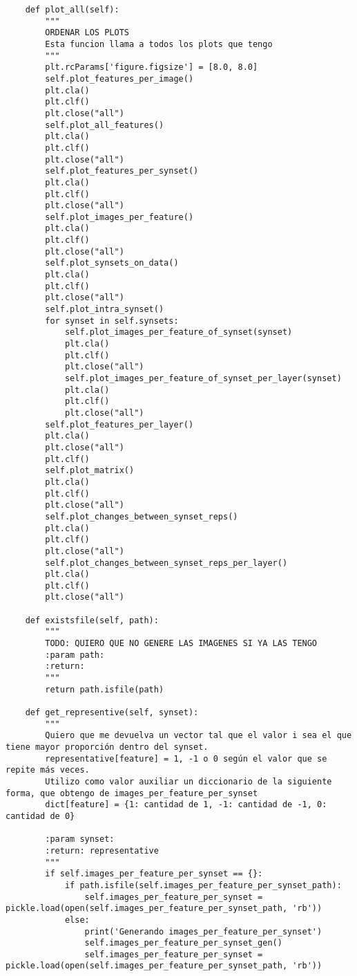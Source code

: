 \documentclass[12,twoside]{TFG-GM}
\theoremstyle{definition}
\theoremstyle{remark}
\begin{document}
\begin{verbatim}
    def plot_all(self):
        """
        ORDENAR LOS PLOTS
        Esta funcion llama a todos los plots que tengo
        """
        plt.rcParams['figure.figsize'] = [8.0, 8.0]
        self.plot_features_per_image()
        plt.cla()
        plt.clf()
        plt.close("all")
        self.plot_all_features()
        plt.cla()
        plt.clf()
        plt.close("all")
        self.plot_features_per_synset()
        plt.cla()
        plt.clf()
        plt.close("all")
        self.plot_images_per_feature()
        plt.cla()
        plt.clf()
        plt.close("all")
        self.plot_synsets_on_data()
        plt.cla()
        plt.clf()
        plt.close("all")
        self.plot_intra_synset()
        for synset in self.synsets:
            self.plot_images_per_feature_of_synset(synset)
            plt.cla()
            plt.clf()
            plt.close("all")
            self.plot_images_per_feature_of_synset_per_layer(synset)
            plt.cla()
            plt.clf()
            plt.close("all")
        self.plot_features_per_layer()
        plt.cla()
        plt.close("all")
        plt.clf()
        self.plot_matrix()
        plt.cla()
        plt.clf()
        plt.close("all")
        self.plot_changes_between_synset_reps()
        plt.cla()
        plt.clf()
        plt.close("all")
        self.plot_changes_between_synset_reps_per_layer()
        plt.cla()
        plt.clf()
        plt.close("all")

    def existsfile(self, path):
        """
        TODO: QUIERO QUE NO GENERE LAS IMAGENES SI YA LAS TENGO
        :param path:
        :return:
        """
        return path.isfile(path)

    def get_representive(self, synset):
        """
        Quiero que me devuelva un vector tal que el valor i sea el que tiene mayor proporción dentro del synset.
        representative[feature] = 1, -1 o 0 según el valor que se repite más veces.
        Utilizo como valor auxiliar un diccionario de la siguiente forma, que obtengo de images_per_feature_per_synset
        dict[feature] = {1: cantidad de 1, -1: cantidad de -1, 0: cantidad de 0}

        :param synset:
        :return: representative
        """
        if self.images_per_feature_per_synset == {}:
            if path.isfile(self.images_per_feature_per_synset_path):
                self.images_per_feature_per_synset = pickle.load(open(self.images_per_feature_per_synset_path, 'rb'))
            else:
                print('Generando images_per_feature_per_synset')
                self.images_per_feature_per_synset_gen()
                self.images_per_feature_per_synset = pickle.load(open(self.images_per_feature_per_synset_path, 'rb'))


\end{verbatim}
\end{document}
